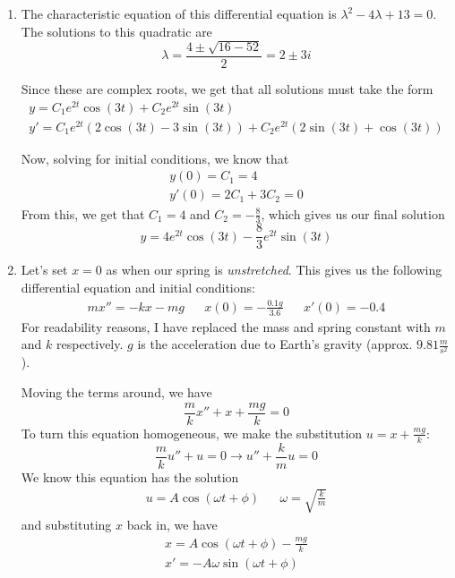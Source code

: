 \documentclass[12pt]{article}
\begin{document}
\begin{enumerate}
    \item The characteristic equation of this differential equation is $\lambda^2 - 4\lambda+13=0$.
          The solutions to this quadratic are
          \[\lambda=\frac{4 \pm \sqrt{16-52}}{2}=2 \pm 3i\]

          Since these are complex roots, we get that all solutions must take the form
          \begin{gather*}
              y=C_1e^{2t}\cos(3t)+C_2e^{2t}\sin(3t) \\
              y'=C_1e^{2t}(2\cos(3t)-3\sin(3t))+C_2e^{2t}(2\sin(3t)+\cos(3t))
          \end{gather*}

          Now, solving for initial conditions, we know that
          \begin{gather*}
              y(0)=C_1=4 \\
              y'(0)=2C_1+3C_2=0
          \end{gather*}
          From this, we get that $C_1=4$ and $C_2=-\frac{8}{3}$, which gives us our final solution
          \[\boxed{y=4e^{2t}\cos(3t)-\frac{8}{3}e^{2t}\sin(3t)}\]
    \item Let's set $x=0$ as when our spring is \textit{unstretched}.
          This gives us the following differential equation and initial conditions:
          \begin{align*}
              mx''=-kx-mg &  & x(0)=-\frac{0.1g}{3.6} &  & x'(0)=-0.4
          \end{align*}
          For readability reasons, I have replaced the mass and spring constant with $m$ and $k$ respectively.
          $g$ is the acceleration due to Earth's gravity (approx. $9.81 \frac{m}{s^2}$).

          Moving the terms around, we have
          \[\frac{m}{k}x''+x+\frac{mg}{k}=0\]
          To turn this equation homogeneous, we make the substitution $u=x+\frac{mg}{k}$:
          \[\frac{m}{k}u''+u=0 \rightarrow u''+\frac{k}{m}u=0\]
          We know this equation has the solution
          \begin{align*}
              u=A\cos\left(\omega t+\phi\right) &  & \omega=\sqrt{\frac{k}{m}}
          \end{align*}
          and substituting $x$ back in, we have
          \begin{gather*}
              x=A\cos\left(\omega t+\phi\right)-\frac{mg}{k} \\
              x'=-A\omega\sin(\omega t+\phi)
          \end{gather*}


\end{enumerate}
\end{document}
